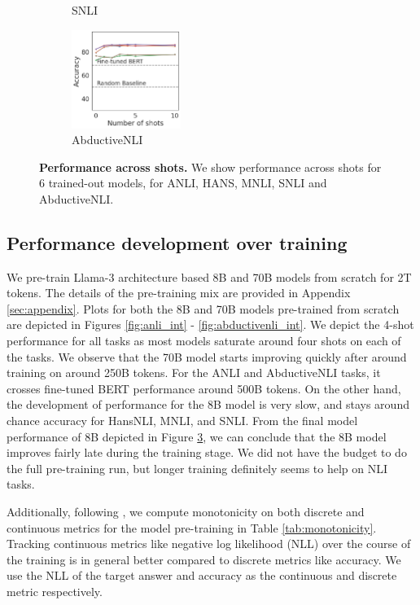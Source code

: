 \begin{figure}[t]
\begin{subfigure}[b]{0.19\textwidth}
    \caption{SNLI}
    \label{fig:hansnli}
    \end{subfigure}
    \begin{subfigure}[b]{0.19\textwidth}
    \centering
    \includegraphics[height=3.2cm, trim=25mm 0 0 0, clip]{figures/abductivenli}
    \caption{AbductiveNLI}
    \label{fig:mnli}
    \end{subfigure}
    \caption{\textbf{Performance across shots.} We show performance across shots for 6 trained-out models, for ANLI, HANS, MNLI, SNLI and AbductiveNLI.}\label{fig:shot_performance}
\end{figure}

\subsection{Performance development over training}

We pre-train Llama-3 architecture based 8B and 70B models from scratch for 2T tokens. The details of the pre-training mix are provided in Appendix \ref{sec:appendix}. Plots for both the 8B and 70B models pre-trained from scratch are depicted in Figures \ref{fig:anli_int} - \ref{fig:abductivenli_int}. We depict the 4-shot performance for all tasks as most models saturate around four shots on each of the tasks. We observe that the 70B model starts improving quickly after around training on around 250B tokens. For the ANLI and AbductiveNLI tasks, it crosses fine-tuned BERT performance around 500B tokens. On the other hand, the development of performance for the 8B model is very slow, and stays around chance accuracy for HansNLI, MNLI, and SNLI. From the final model performance of 8B depicted in Figure \ref{fig:shot_performance}, we can conclude that the 8B model improves fairly late during the training stage. We did not have the budget to do the full pre-training run, but longer training definitely seems to help on NLI tasks.

Additionally, following \citet{variancepaper}, we compute monotonicity on both discrete and continuous metrics for the model pre-training in Table \ref{tab:monotonicity}. Tracking continuous metrics like negative log likelihood (NLL) over the course of the training is in general better compared to discrete metrics like accuracy. We use the NLL of the target answer and accuracy as the continuous and discrete metric respectively.

